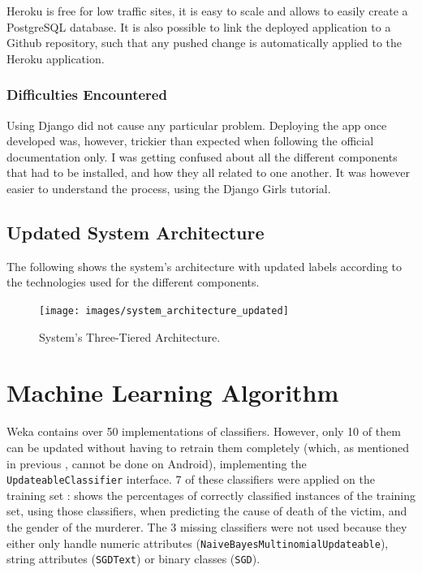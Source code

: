 \documentclass{mproj}
\begin{document}
Heroku is free for low traffic sites, it is easy to scale and allows to easily create a PostgreSQL database. It is also possible to link the deployed application to a Github repository, such that any pushed change is automatically applied to the Heroku application. \cite[Chapter~1]{herokubook}

\subsubsection*{Difficulties Encountered}

Using Django did not cause any particular problem. Deploying the app once developed was, however, trickier than expected when following the official documentation only. I was getting confused about all the different components that had to be installed, and how they all related to one another. It was however easier to understand the process, using the Django Girls tutorial. \cite{djangogirls}

\subsection*{Updated System Architecture}

The following  shows the system's architecture with updated labels according to the technologies used for the different components.

\begin{figure}[h]
	\centering
	\texttt{[image: images/system\_architecture\_updated]}
	\caption{System's Three-Tiered Architecture.}
	\label{fig:architecture_updated}
\end{figure}

\section{Machine Learning Algorithm}

Weka contains over 50 implementations of classifiers. \cite[Table~11.5]{wekabook} However, only 10 of them can be updated without having to retrain them completely (which, as mentioned in previous , cannot be done on Android), implementing the \verb|UpdateableClassifier| interface. \cite{wekaupdateable} 7 of these classifiers were applied on the training set :  shows the percentages of correctly classified instances of the training set, using those classifiers, when predicting the cause of death of the victim, and the gender of the murderer. The 3 missing classifiers were not used because they either only handle numeric attributes (\verb|NaiveBayesMultinomialUpdateable|), string attributes (\verb|SGDText|) or binary classes (\verb|SGD|).
\end{document}
